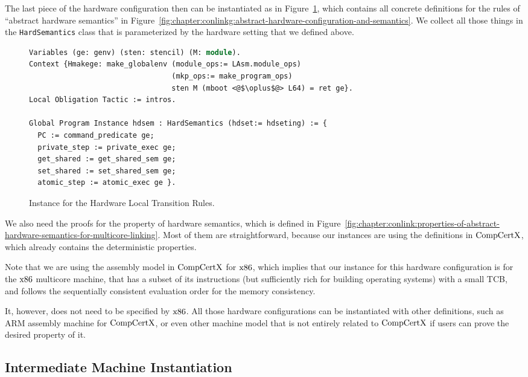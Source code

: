 The last piece of the hardware configuration then can be instantiated as in Figure~\ref{fig:chapter:certikos:hardware-local-step-transition-rules},
which contains all concrete definitions for the rules of ``abstract hardware semantics'' in  Figure~\ref{fig:chapter:conlinkg:abstract-hardware-configuration-and-semantics}.
We collect all those things in the \lstinline$HardSemantics$ class that is parameterized by the hardware setting that we defined above. 
\begin{figure}
\begin{lstlisting}[language=Caml]
Variables (ge: genv) (sten: stencil) (M: module).
Context {Hmakege: make_globalenv (module_ops:= LAsm.module_ops) 
                                 (mkp_ops:= make_program_ops) 
                                 sten M (mboot <@$\oplus$@> L64) = ret ge}.
Local Obligation Tactic := intros.

Global Program Instance hdsem : HardSemantics (hdset:= hdseting) := {
  PC := command_predicate ge;
  private_step := private_exec ge;
  get_shared := get_shared_sem ge;
  set_shared := set_shared_sem ge;
  atomic_step := atomic_exec ge }.
\end{lstlisting}
\caption{Instance for the Hardware Local Transition Rules.}
\label{fig:chapter:certikos:hardware-local-step-transition-rules}
\end{figure}
We also need the proofs for the property of hardware semantics, which is defined in Figure~\ref{fig:chapter:conlink:properties-of-abstract-hardware-semantics-for-multicore-linking}. 
Most of them are straightforward, because our instances are using the definitions in $\mathrm{CompCertX}$,
which already contains the deterministic properties. 

Note that we are using the assembly model in $\mathrm{CompCertX}$ for $\mathrm{x86}$, which implies that 
our instance for this hardware configuration is 
for the $\mathrm{x86}$ multicore machine,
that has a subset of its instructions (but sufficiently rich for building operating systems) with a small TCB, 
and follows the sequentially consistent evaluation order for the memory consistency. 

It, however, does not need to be specified by $\mathrm{x86}$. 
All  those hardware configurations can be instantiated with other definitions, such as ARM assembly machine for $\mathrm{CompCertX}$, 
or even other machine model that is not entirely related to $\mathrm{CompCertX}$ if users can prove the desired property of it. 

\subsection{Intermediate Machine Instantiation}
\label{chapter:certikos:subsec:intermediate-machine-instantiation}

